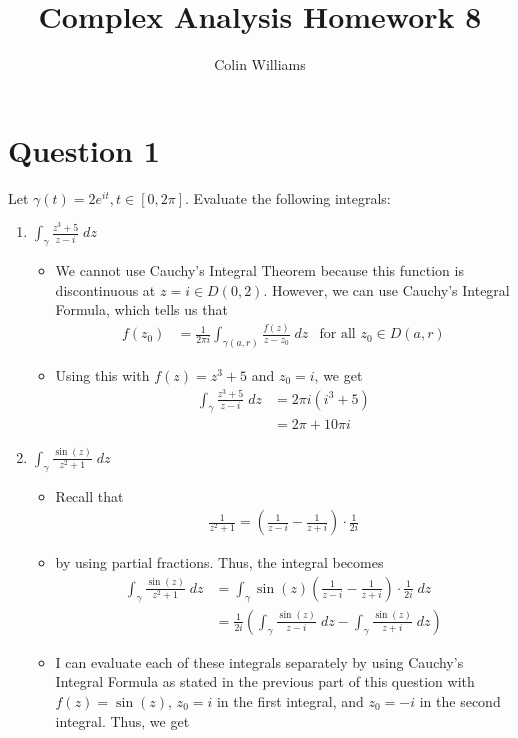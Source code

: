 \documentclass[10pt,a4paper]{article}
\title{Complex Analysis Homework 8}
\author{Colin Williams}
\theoremstyle{definition}
\begin{document}
\maketitle

\section*{Question 1}
Let $\gamma(t) = 2e^{it}, t \in [0,2\pi]$. Evaluate the following integrals:
\begin{enumerate}[label = (\alph*)]
\item $\displaystyle \int_{\gamma} \frac{z^3 + 5}{z - i} \; dz$
	\begin{itemize}
	\item We cannot use Cauchy's Integral Theorem because this function is discontinuous at $z = i \in D(0,2)$. However, we can use Cauchy's Integral Formula, which tells us that
	\begin{align*}
	f(z_0) &= \frac{1}{2\pi i} \int_{\gamma(a,r)} \frac{f(z)}{z - z_0} \; dz &\text{for all $z_0 \in D(a,r)$}
	\end{align*}
	\item Using this with $f(z) = z^3 + 5$ and $z_0 = i$, we get
	\begin{align*}
	\int_{\gamma} \frac{z^3 + 5}{z - i} \; dz &= 2\pi i (i^3 + 5)\\
	&= \boxed{2\pi + 10\pi i}
	\end{align*}
	\end{itemize}
\item $\displaystyle \int_{\gamma} \frac{\sin(z)}{z^2 + 1} \; dz$
	\begin{itemize}
	\item Recall that 
	\begin{align*}
	\frac{1}{z^2 + 1} = \left(\frac{1}{z - i} - \frac{1}{z + i}\right)\cdot \frac{1}{2i}
	\end{align*}
	\item by using partial fractions. Thus, the integral becomes
	\begin{align*}
	\int_{\gamma} \frac{\sin(z)}{z^2 + 1} \; dz &= \int_{\gamma} \sin(z) \left(\frac{1}{z - i} - \frac{1}{z + i}\right)\cdot \frac{1}{2i} \; dz\\
	&= \frac{1}{2i}\left( \int_{\gamma} \frac{\sin(z)}{z - i} \; dz - \int_{\gamma} \frac{\sin(z)}{z + i} \; dz \right)
	\end{align*}
	\item I can evaluate each of these integrals separately by using Cauchy's Integral Formula as stated in the previous part of this question with $f(z) = \sin(z)$, $z_0 = i$ in the first integral, and $z_0 = -i$ in the second integral. Thus, we get

\end{itemize}
\end{enumerate}
\end{document}
